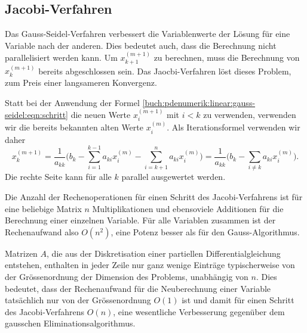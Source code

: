 %
%
\subsection{Jacobi-Verfahren
\label{buch:pdenumerik:linear:subsection:jacobi}}
Das Gauss-Seidel-Verfahren verbessert die Variablenwerte der Lösung
für eine Variable nach der anderen.
Dies bedeutet auch, dass die Berechnung nicht parallelisiert werden
kann.
Um $x_{k+1}^{(m+1)}$ zu berechnen, muss die Berechnung von $x_k^{(m+1)}$
bereits abgeschlossen sein.
Das Jaocbi-Verfahren löst dieses Problem, zum Preis einer langsameren
Konvergenz.

Statt bei der Anwendung der Formel
\eqref{buch:pdenumerik:linear:gauss-seidel:eqn:schritt}
die neuen Werte $x_i^{(m+1)}$ mit $i<k$ zu verwenden, verwenden wir
die bereits bekannten alten Werte $x_i^{(m)}$.
Als Iterationsformel verwenden wir daher
\begin{equation}
x_k^{(m+1)}
=
\frac{1}{a_{kk}}
\biggl(
b_k
-
\sum_{i=1}^{k-1} a_{ki} x_i^{(m)}
-
\sum_{i=k+1}^n a_{ki} x_i^{(m)}
\biggr)
=
\frac{1}{a_{kk}}
\biggl(
b_k
-
\sum_{i\ne k} a_{ki} x_i^{(m)}
\biggr).
\end{equation}
Die rechte Seite kann für alle $k$ parallel ausgewertet werden.

Die Anzahl der Rechenoperationen für einen Schritt des Jacobi-Verfahrens
ist für eine beliebige Matrix $n$ Multiplikationen und ebensoviele
Additionen für die Berechnung einer einzelnen Variable.
Für alle Variablen zusammen ist der Rechenaufwand also $O(n^2)$,
eine Potenz besser als für den Gauss-Algorithmus.

Matrizen $A$, die aus der Diskretisation einer partiellen
Differentialgleichung entstehen, enthalten in jeder Zeile nur ganz
wenige Einträge typischerweise von der Grössenordnung der
Dimension des Problems, unabhängig von $n$.
Dies bedeutet, dass der Rechenaufwand für die Neuberechnung
einer Variable tatsächlich nur von der Grössenordnung $O(1)$ ist
und damit für einen Schritt des Jacobi-Verfahrens $O(n)$, eine
wesentliche Verbesserung gegenüber dem gausschen Eliminationsalgorithmus.

%
%
